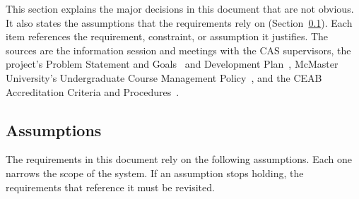 \documentclass[12pt]{article}
\begin{document}
This section explains the major decisions in this document that are not
obvious. It also states the assumptions that the requirements rely on
(Section~\ref{sec_Assumptions}). Each item references the requirement,
constraint, or assumption it justifies. The sources are the information
session and meetings with the CAS supervisors, the project's Problem
Statement and Goals~\citep{TeamBVSH2026PS} and Development Plan~\citep{TeamBVSH2026DP}, McMaster University's Undergraduate Course
Management Policy~\citep{McMasterUCMP2025}, and the CEAB Accreditation Criteria
and Procedures~\citep{CEAB2025}.

\subsection{Assumptions} \label{sec_Assumptions}

The requirements in this document rely on the following assumptions. Each one
narrows the scope of the system. If an assumption stops holding, the
requirements that reference it must be revisited.
\end{document}
